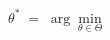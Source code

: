 \documentclass[preview]{standalone}
\begin{document}
\begin{align*}
\theta^* \;=\; \arg\!\min_{\theta \in \Theta}\;
\end{align*}
\end{document}
